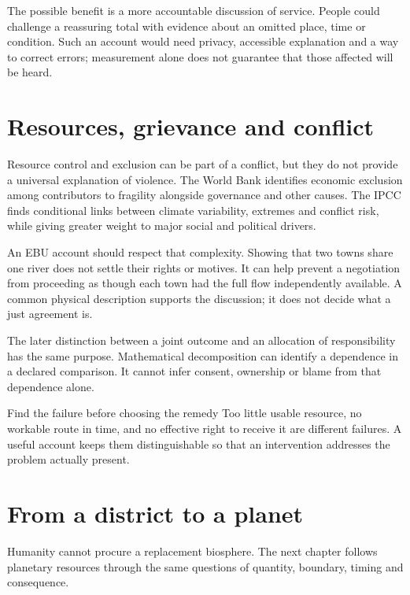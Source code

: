 The possible benefit is a more accountable discussion of service. People could challenge a reassuring total with evidence about an omitted place, time or condition. Such an account would need privacy, accessible explanation and a way to correct errors; measurement alone does not guarantee that those affected will be heard.

\section{Resources, grievance and conflict}
Resource control and exclusion can be part of a conflict, but they do not provide a universal explanation of violence. The World Bank identifies economic exclusion among contributors to fragility alongside governance and other causes.\cite{intro-conflict} The IPCC finds conditional links between climate variability, extremes and conflict risk, while giving greater weight to major social and political drivers.\cite{intro-ipcc-conflict}

An EBU account should respect that complexity. Showing that two towns share one river does not settle their rights or motives. It can help prevent a negotiation from proceeding as though each town had the full flow independently available. A common physical description supports the discussion; it does not decide what a just agreement is.

The later distinction between a joint outcome and an allocation of responsibility has the same purpose. Mathematical decomposition can identify a dependence in a declared comparison. It cannot infer consent, ownership or blame from that dependence alone.

\begin{intuitionbox}{Find the failure before choosing the remedy}
Too little usable resource, no workable route in time, and no effective right to receive it are different failures. A useful account keeps them distinguishable so that an intervention addresses the problem actually present.
\end{intuitionbox}

\section{From a district to a planet}
Humanity cannot procure a replacement biosphere. The next chapter follows planetary resources through the same questions of quantity, boundary, timing and consequence.
